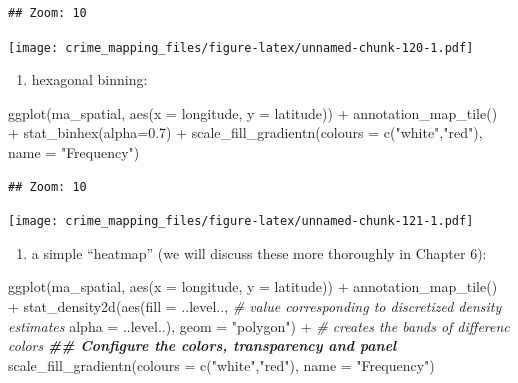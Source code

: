 \documentclass[
]{book}
\newenvironment{Shaded}{\begin{snugshade}}{\end{snugshade}}
\newcommand{\AttributeTok}[1]{\textcolor[rgb]{0.77,0.63,0.00}{#1}}
\newcommand{\CommentTok}[1]{\textcolor[rgb]{0.56,0.35,0.01}{\textit{#1}}}
\newcommand{\DocumentationTok}[1]{\textcolor[rgb]{0.56,0.35,0.01}{\textbf{\textit{#1}}}}
\newcommand{\FloatTok}[1]{\textcolor[rgb]{0.00,0.00,0.81}{#1}}
\newcommand{\FunctionTok}[1]{\textcolor[rgb]{0.00,0.00,0.00}{#1}}
\newcommand{\NormalTok}[1]{#1}
\newcommand{\SpecialCharTok}[1]{\textcolor[rgb]{0.00,0.00,0.00}{#1}}
\newcommand{\StringTok}[1]{\textcolor[rgb]{0.31,0.60,0.02}{#1}}
\providecommand{\tightlist}{%
  \setlength{\itemsep}{0pt}\setlength{\parskip}{0pt}}
\begin{document}
\begin{verbatim}
## Zoom: 10
\end{verbatim}

\texttt{[image: crime\_mapping\_files/figure-latex/unnamed-chunk-120-1.pdf]}

\begin{enumerate}
\def\labelenumi{\alph{enumi})}
\setcounter{enumi}{1}
\tightlist
\item
  hexagonal binning:
\end{enumerate}

\begin{Shaded}
\begin{Highlighting}[]
\FunctionTok{ggplot}\NormalTok{(ma\_spatial, }\FunctionTok{aes}\NormalTok{(}\AttributeTok{x =}\NormalTok{ longitude, }\AttributeTok{y =}\NormalTok{ latitude)) }\SpecialCharTok{+} 
  \FunctionTok{annotation\_map\_tile}\NormalTok{() }\SpecialCharTok{+} 
  \FunctionTok{stat\_binhex}\NormalTok{(}\AttributeTok{alpha=}\FloatTok{0.7}\NormalTok{) }\SpecialCharTok{+} 
  \FunctionTok{scale\_fill\_gradientn}\NormalTok{(}\AttributeTok{colours =} \FunctionTok{c}\NormalTok{(}\StringTok{"white"}\NormalTok{,}\StringTok{"red"}\NormalTok{), }
                       \AttributeTok{name =} \StringTok{"Frequency"}\NormalTok{)}
\end{Highlighting}
\end{Shaded}

\begin{verbatim}
## Zoom: 10
\end{verbatim}

\texttt{[image: crime\_mapping\_files/figure-latex/unnamed-chunk-121-1.pdf]}

\begin{enumerate}
\def\labelenumi{\alph{enumi})}
\setcounter{enumi}{2}
\tightlist
\item
  a simple ``heatmap'' (we will discuss these more thoroughly in Chapter 6):
\end{enumerate}

\begin{Shaded}
\begin{Highlighting}[]
\FunctionTok{ggplot}\NormalTok{(ma\_spatial, }\FunctionTok{aes}\NormalTok{(}\AttributeTok{x =}\NormalTok{ longitude, }\AttributeTok{y =}\NormalTok{ latitude)) }\SpecialCharTok{+} 
  \FunctionTok{annotation\_map\_tile}\NormalTok{() }\SpecialCharTok{+} 
  \FunctionTok{stat\_density2d}\NormalTok{(}\FunctionTok{aes}\NormalTok{(}\AttributeTok{fill =}\NormalTok{ ..level.., }\CommentTok{\# value corresponding to discretized density estimates }
                     \AttributeTok{alpha =}\NormalTok{ ..level..), }
                 \AttributeTok{geom =} \StringTok{"polygon"}\NormalTok{) }\SpecialCharTok{+}  \CommentTok{\# creates the bands of differenc colors}
  \DocumentationTok{\#\# Configure the colors, transparency and panel}
  \FunctionTok{scale\_fill\_gradientn}\NormalTok{(}\AttributeTok{colours =} \FunctionTok{c}\NormalTok{(}\StringTok{"white"}\NormalTok{,}\StringTok{"red"}\NormalTok{), }
                       \AttributeTok{name =} \StringTok{"Frequency"}\NormalTok{) }
\end{Highlighting}
\end{Shaded}
\end{document}
